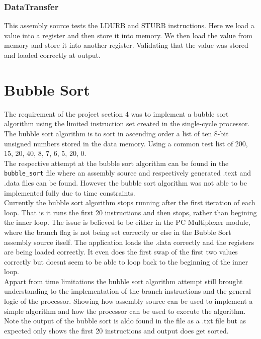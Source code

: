 \documentclass{article}
\begin{document}
\subsubsection{DataTransfer}
This assembly source tests the LDURB and STURB instructions. Here we load a value into a register and then store it into memory. We then load the value from memory and store it into another register. Validating that the value was stored and loaded correctly at output.\\

\section{Bubble Sort}
The requirement of the project section 4 was to implement a bubble sort algorithm using the limited instruction set created in the single-cycle processor. The bubble sort algorithm is to sort in ascending order a list of ten 8-bit unsigned numbers stored in the data memory. Using a common test list of 200, 15, 20, 40, 8, 7, 6, 5, 20, 0. \\

The respective attempt at the bubble sort algorithm can be found in the \texttt{bubble\_sort} file where an assembly source and respectively generated .text and .data files can be found. However the bubble sort algorithm was not able to be implemented fully due to time constraints.\\

Currently the bubble sort algorithm stops running after the first iteration of each loop. That is it runs the first 20 instructions and then stops, rather than begining the inner loop. The issue is believed to be either in the PC Multiplexer module, where the branch flag is not being set correctly or else in the Bubble Sort assembly source itself. The application loads the .data correctly and the registers are being loaded correctly. It even does the first swap of the first two values correctly but doesnt seem to be able to loop back to the beginning of the inner loop.\\
  
Appart from time limitations the bubble sort algorithm attempt still brought understanding to the implementation of the branch instructions and the general logic of the processor. Showing how assembly source can be used to implement a simple algorithm and how the processor can be used to execute the algorithm.\\

Note the output of the bubble sort is aldo found in the file as a .txt file but as expected only shows the first 20 instructions and output does get sorted.\\
\end{document}
